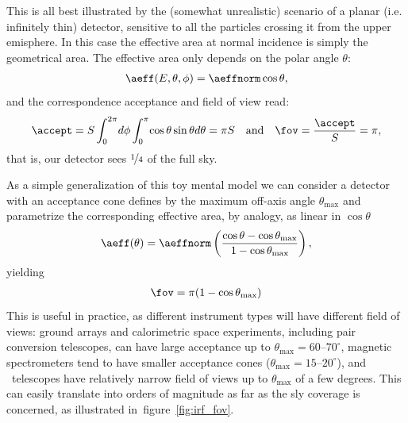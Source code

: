 This is all best illustrated by the (somewhat unrealistic) scenario of a planar
(i.e. infinitely thin) detector, sensitive to all the particles crossing it from
the upper emisphere. In this case the effective area at normal incidence is simply
the geometrical area. The effective area only depends on the polar angle $\theta$:
\begin{align}
  \aeff(E, \theta, \phi) = \aeffnorm \cos\theta,
\end{align}
and the correspondence acceptance and field of view read:
\begin{align}
  \accept = S\int_0^{2\pi}\!d\phi
  \int_0^\pi \!\cos\theta\sin\theta d\theta = \pi S
  \quad\text{and}\quad
  \fov = \frac{\accept}{S} = \pi,
\end{align}
that is, our detector sees $\nicefrac{1}{4}$ of the full sky.

\begin{marginfigure}
  
  \caption{Field of view, expressed as a fraction of the full sky, as a function
  of the maximum angle of the acceptance cone. When $\theta_\text{max} = 90^\circ$,
  this reduces to the planar detector.}
  \label{fig:irf_fov}
\end{marginfigure}

As a simple generalization of this toy mental model we can consider a detector
with an acceptance cone defines by the maximum off-axis angle $\theta_\text{max}$
and parametrize the corresponding effective area, by analogy, as linear in $\cos\theta$
\begin{align*}
  \aeff(\theta) = \aeffnorm
  \left(\frac{\cos\theta - \cos\theta_\text{max}}{1 - \cos\theta_\text{max}}\right),
\end{align*}
yielding
\begin{align}
  \fov = \pi (1 - \cos\theta_\text{max})
\end{align}
This is useful in practice, as different instrument types will have different
field of views: ground arrays and calorimetric space experiments, including
pair conversion telescopes, can have large acceptance up to
$\theta_\text{max} = 60$--$70^\circ$, magnetic spectrometers tend to have
smaller acceptance cones ($\theta_\text{max} = 15$--$20^\circ$), and \cherenkov\
telescopes have relatively narrow field of views up to $\theta_\text{max}$ of a
few degrees. This can easily translate into orders of magnitude as far as the
sly coverage is concerned, as illustrated in~figure~\ref{fig:irf_fov}.

